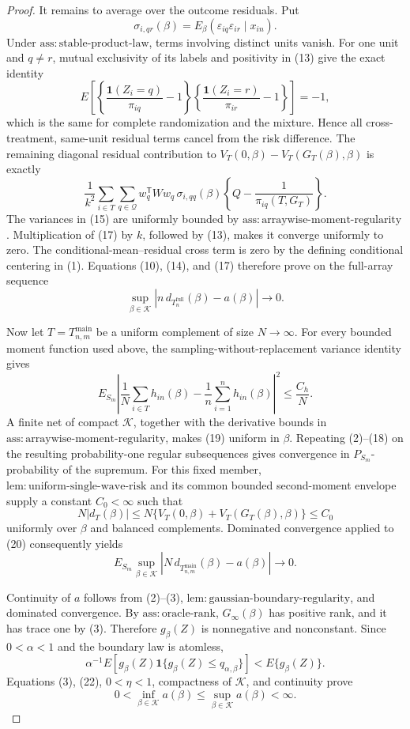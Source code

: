 \documentclass{article}
\begin{document}
\begin{proof}
It remains to average over the outcome residuals.  Put
\[
\sigma_{i,qr}(\beta)
=E_\beta(\varepsilon_{iq}\varepsilon_{ir}\mid x_{in}).
\tag{15}
\]
Under \(\mathrm{ass{:}stable\text{-}product\text{-}law}\), terms involving distinct units vanish.  For one unit and \(q\neq r\), mutual exclusivity of its labels and positivity in (13) give the exact identity
\[
E\!\left[
\left\{\frac{\mathbf 1(Z_i=q)}{\pi_{iq}}-1\right\}
\left\{\frac{\mathbf 1(Z_i=r)}{\pi_{ir}}-1\right\}
\right]=-1,
\tag{16}
\]
which is the same for complete randomization and the mixture.  Hence all cross-treatment, same-unit residual terms cancel from the risk difference.  The remaining diagonal residual contribution to \(V_T(0,\beta)-V_T(G_T(\beta),\beta)\) is exactly
\[
\frac1{k^2}\sum_{i\in T}\sum_{q\in\mathcal Q}
w_q^{\mathsf T}Ww_q\,\sigma_{i,qq}(\beta)
\left\{Q-\frac1{\pi_{iq}(T,G_T)}\right\}.
\tag{17}
\]
The variances in (15) are uniformly bounded by \(\mathrm{ass{:}arraywise\text{-}moment\text{-}regularity}\).  Multiplication of (17) by \(k\), followed by (13), makes it converge uniformly to zero.  The conditional-mean--residual cross term is zero by the defining conditional centering in (1).  Equations (10), (14), and (17) therefore prove on the full-array sequence
\[
\sup_{\beta\in\mathcal K}
\left|n\,d_{T_n^{\mathrm{full}}}(\beta)-a(\beta)\right|
\longrightarrow0.
\tag{18}
\]

Now let \(T=T_{n,m}^{\mathrm{main}}\) be a uniform complement of size \(N\to\infty\).  For every bounded moment function used above, the sampling-without-replacement variance identity gives
\[
E_{S_m}\left|
\frac1N\sum_{i\in T}h_{in}(\beta)
-\frac1n\sum_{i=1}^nh_{in}(\beta)
\right|^2\leq\frac{C_h}{N}.
\tag{19}
\]
A finite net of compact \(\mathcal K\), together with the derivative bounds in \(\mathrm{ass{:}arraywise\text{-}moment\text{-}regularity}\), makes (19) uniform in \(\beta\).  Repeating (2)--(18) on the resulting probability-one regular subsequences gives convergence in \(P_{S_m}\)-probability of the supremum.  For this fixed member, \(\mathrm{lem{:}uniform\text{-}single\text{-}wave\text{-}risk}\) and its common bounded second-moment envelope supply a constant \(C_0<\infty\) such that
\[
N|d_T(\beta)|
\leq N\{V_T(0,\beta)+V_T(G_T(\beta),\beta)\}
\leq C_0
\tag{20}
\]
uniformly over \(\beta\) and balanced complements.  Dominated convergence applied to (20) consequently yields
\[
E_{S_m}\sup_{\beta\in\mathcal K}
\left|N\,d_{T_{n,m}^{\mathrm{main}}}(\beta)-a(\beta)\right|
\longrightarrow0.
\tag{21}
\]

Continuity of \(a\) follows from (2)--(3), \(\mathrm{lem{:}gaussian\text{-}boundary\text{-}regularity}\), and dominated convergence.  By \(\mathrm{ass{:}oracle\text{-}rank}\), \(G_\infty(\beta)\) has positive rank, and it has trace one by (3).  Therefore \(g_\beta(Z)\) is nonnegative and nonconstant.  Since \(0<\alpha<1\) and the boundary law is atomless,
\[
\alpha^{-1}E\!\left[
g_\beta(Z)\mathbf 1\{g_\beta(Z)\leq q_{\alpha,\beta}\}
\right]
<E\{g_\beta(Z)\}.
\tag{22}
\]
Equations (3), (22), \(0<\eta<1\), compactness of \(\mathcal K\), and continuity prove
\[
0<\inf_{\beta\in\mathcal K}a(\beta)
\leq\sup_{\beta\in\mathcal K}a(\beta)<\infty.
\tag{23}
\]


\end{proof}
\end{document}
